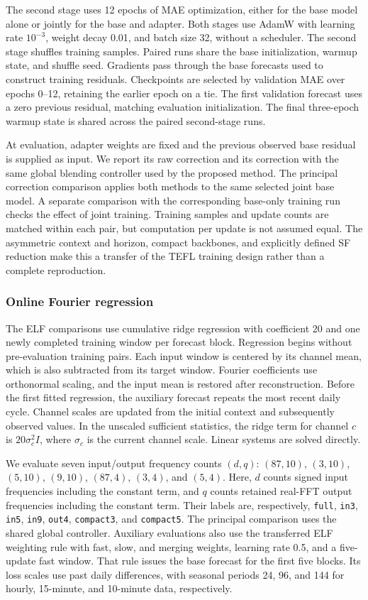 The second stage uses 12 epochs of MAE optimization, either for the base model alone or jointly for the base and adapter. Both stages use AdamW with learning rate $10^{-3}$, weight decay 0.01, and batch size 32, without a scheduler. The second stage shuffles training samples. Paired runs share the base initialization, warmup state, and shuffle seed. Gradients pass through the base forecasts used to construct training residuals. Checkpoints are selected by validation MAE over epochs 0--12, retaining the earlier epoch on a tie. The first validation forecast uses a zero previous residual, matching evaluation initialization. The final three-epoch warmup state is shared across the paired second-stage runs.

At evaluation, adapter weights are fixed and the previous observed base residual is supplied as input. We report its raw correction and its correction with the same global blending controller used by the proposed method. The principal correction comparison applies both methods to the same selected joint base model. A separate comparison with the corresponding base-only training run checks the effect of joint training. Training samples and update counts are matched within each pair, but computation per update is not assumed equal. The asymmetric context and horizon, compact backbones, and explicitly defined SF reduction make this a transfer of the TEFL training design rather than a complete reproduction.

\subsubsection{Online Fourier regression}
The ELF comparisons use cumulative ridge regression with coefficient 20 and one newly completed training window per forecast block. Regression begins without pre-evaluation training pairs. Each input window is centered by its channel mean, which is also subtracted from its target window. Fourier coefficients use orthonormal scaling, and the input mean is restored after reconstruction. Before the first fitted regression, the auxiliary forecast repeats the most recent daily cycle. Channel scales are updated from the initial context and subsequently observed values. In the unscaled sufficient statistics, the ridge term for channel $c$ is $20\sigma_c^2 I$, where $\sigma_c$ is the current channel scale. Linear systems are solved directly.

We evaluate seven input/output frequency counts $(d,q)$: $(87,10)$, $(3,10)$, $(5,10)$, $(9,10)$, $(87,4)$, $(3,4)$, and $(5,4)$. Here, $d$ counts signed input frequencies including the constant term, and $q$ counts retained real-FFT output frequencies including the constant term. Their labels are, respectively, \texttt{full}, \texttt{in3}, \texttt{in5}, \texttt{in9}, \texttt{out4}, \texttt{compact3}, and \texttt{compact5}. The principal comparison uses the shared global controller. Auxiliary evaluations also use the transferred ELF weighting rule with fast, slow, and merging weights, learning rate 0.5, and a five-update fast window. That rule issues the base forecast for the first five blocks. Its loss scales use past daily differences, with seasonal periods 24, 96, and 144 for hourly, 15-minute, and 10-minute data, respectively.

